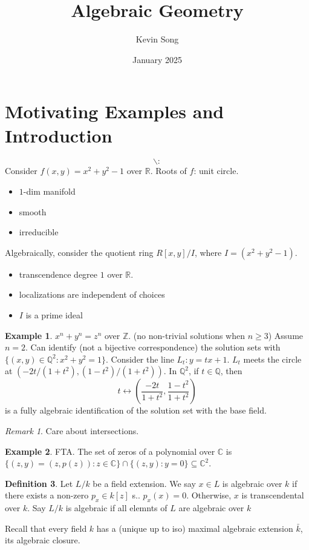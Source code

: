 \documentclass{article}
\title{Algebraic Geometry}
\author{Kevin Song}
\date{January 2025}
\theoremstyle{definition}
\newtheorem{defn}{Definition}[section]
\newtheorem{example}[defn]{Example}
\theoremstyle{remark}
\newtheorem{rem}{Remark}
\theoremstyle{plain}
\newcommand{\ZZ}{\mathbb{Z}}
\newcommand{\QQ}{\mathbb{Q}}
\newcommand{\RR}{\mathbb{R}}
\newcommand{\CC}{\mathbb{C}}
\begin{document}
\maketitle
\section{Motivating Examples and Introduction}
\[\backslash:\tag{Owen's signature}\]
Consider $f(x,y)=x^2+y^2-1$ over $\RR$. Roots of $f$: unit circle.
\begin{itemize}
    \item $1$-dim manifold
    \item smooth
    \item irreducible
\end{itemize}
Algebraically, consider the quotient ring $R[x,y]/I$, where $I=(x^2+y^2-1)$.
\begin{itemize}
    \item transcendence degree $1$ over $\RR$.
    \item localizations are independent of choices
    \item $I$ is a prime ideal
\end{itemize}
\begin{example}
    $x^n+y^n=z^n$ over $\ZZ$. (no non-trivial solutions when $n\ge 3$) Assume $n=2$. Can identify (not a bijective correspondence) the solution sets with $\{(x,y)\in\QQ^2:x^2+y^2=1\}$. Consider the line $L_t:y=tx+1$. $L_t$ meets the circle at $(-2t/(1+t^2),(1-t^2)/(1+t^2))$. In $\QQ^2$, if $t\in \QQ$, then 
    \[t\leftrightarrow\left(\dfrac{-2t}{1+t^2},\dfrac{1-t^2}{1+t^2}\right)\]
    is a fully algebraic identification of the solution set with the base field.
\end{example}
\begin{rem}
    Care about intersections.
\end{rem}
\begin{example}
    FTA. The set of zeros of a polynomial over $\CC$ is $\{(z,y)=(z,p(z)):z\in\CC\}\cap\{(z,y):y=0\}\subseteq\CC^2$.
\end{example}
\begin{defn}
    Let $L/k$ be a field extension. We say $x\in L$ is algebraic over $k$ if there exists a non-zero $p_x\in k[z]$ s.. $p_x(x)=0$. Otherwise, $x$ is transcendental over $k$. Say $L/k$ is algebraic if all elemnts of $L$ are algebraic over $k$
\end{defn}
Recall that every field $k$ has a (unique up to iso) maximal algebraic extension $\bar k$, its algebraic closure.
\end{document}

